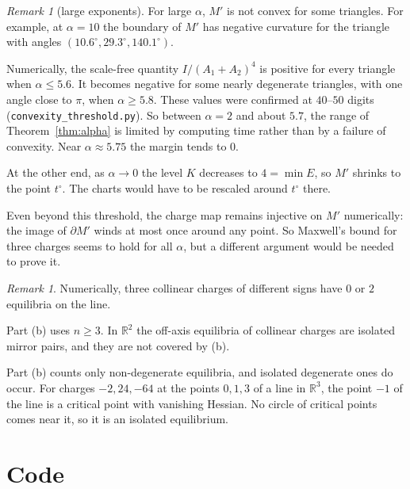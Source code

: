 \documentclass[11pt]{amsart}
\theoremstyle{remark}
\newtheorem{remark}[theorem]{Remark}
\newcommand{\R}{\mathbb{R}}
\begin{document}
\begin{remark}[large exponents]\label{rem:large}
For large $\alpha$, $M'$ is not convex for some triangles. For example, at $\alpha=10$ the boundary of $M'$ has negative
curvature for the triangle with angles $(10.6^\circ,29.3^\circ,140.1^\circ)$.

Numerically, the scale-free quantity $I/(A_1+A_2)^4$ is positive for every triangle when $\alpha\le5.6$. It becomes
negative for some nearly degenerate triangles, with one angle close to $\pi$, when $\alpha\ge5.8$. These values were
confirmed at $40$--$50$ digits (\texttt{convexity\_threshold.py}). So between $\alpha=2$ and about $5.7$, the range of
Theorem~\ref{thm:alpha} is limited by computing time rather than by a failure of convexity. Near $\alpha\approx5.75$ the
margin tends to $0$.

At the other end, as $\alpha\to0$ the level $K$ decreases to $4=\min E$, so $M'$ shrinks to the point $t^\circ$. The
charts would have to be rescaled around $t^\circ$ there.

Even beyond this threshold, the charge map remains injective on $M'$ numerically: the image of $\partial M'$ winds at
most once around any point. So Maxwell's bound for three charges seems to hold for all $\alpha$, but a different
argument would be needed to prove it.
\end{remark}

\begin{remark}
Numerically, three collinear charges of different signs have $0$ or $2$ equilibria on the line.

Part (b) uses $n\ge3$. In $\R^2$ the off-axis equilibria of collinear charges are isolated mirror pairs, and they are
not covered by (b).

Part (b) counts only non-degenerate equilibria, and isolated degenerate ones do occur. For charges $-2,24,-64$ at the
points $0,1,3$ of a line in $\R^3$, the point $-1$ of the line is a critical point with vanishing Hessian. No circle of
critical points comes near it, so it is an isolated equilibrium.
\end{remark}

\section{Code}\label{sec:code}
\end{document}
